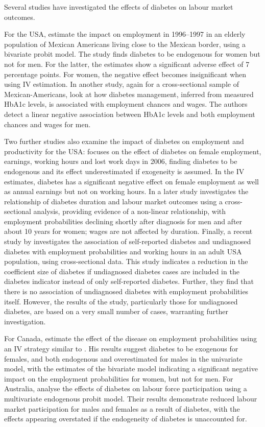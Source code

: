 Several studies have investigated the effects of diabetes on labour market outcomes. 

For the USA, \textcite{Brown2005} estimate  the impact on employment in 1996--1997 in an elderly population of Mexican Americans living close to the Mexican border, using a bivariate probit model. The study finds diabetes to be endogenous for women but not for men.  For the latter, the estimates show a significant adverse effect of 7 percentage points. For women, the negative effect becomes insignificant when using \ac{IV} estimation. In another study, again for a cross-sectional sample of  Mexican-Americans, \textcite{BrownIII2011} look at how diabetes management, inferred from measured \ac{HbA1c} levels, is associated with employment chances and wages. The authors detect a linear negative association between \ac{HbA1c} levels and both employment chances and wages for men. 

Two further studies also examine the impact of diabetes on employment and productivity for the USA: \textcite{Minor2011} focuses on the effect of diabetes on female employment, earnings, working hours and lost work days in 2006, finding diabetes to be endogenous and its effect underestimated if exogeneity is assumed. In the \ac{IV} estimates, diabetes has a significant negative effect on female employment as well as annual earnings but not on working hours. In a later study \textcite{Minor2013} investigates the relationship of diabetes duration and labour market outcomes using a cross-sectional analysis, providing evidence of a non-linear relationship, with employment probabilities declining shortly after diagnosis for men and after about 10 years for women; wages are not affected by duration. Finally, a recent study by \textcite{Minor2015} investigates the association of self-reported diabetes and undiagnosed diabetes with employment probabilities and working hours in an adult USA population, using cross-sectional data. This study indicates a reduction in the coefficient size of diabetes if undiagnosed diabetes cases are included in the diabetes indicator instead of only self-reported diabetes. Further, they find that there is no association of undiagnosed diabetes with employment probabilities itself. However, the results of the study, particularly those for undiagnosed diabetes, are based on a very small number of cases, warranting further investigation.

For Canada, \textcite{Latif2009} estimate the effect of the disease on employment probabilities using an \ac{IV} strategy similar to \textcite{Brown2005}. His results suggest diabetes to be exogenous for females, and both endogenous and overestimated for males in the univariate model, with the estimates of the bivariate model indicating a significant negative impact on the employment probabilities for women, but not for men. For Australia, \textcite{Zhang2009} analyse the effects of diabetes on labour force participation using a multivariate endogenous probit model. Their results demonstrate reduced labour market participation for males and females as a result of diabetes, with the effects appearing overstated if the endogeneity of diabetes is unaccounted for. 

